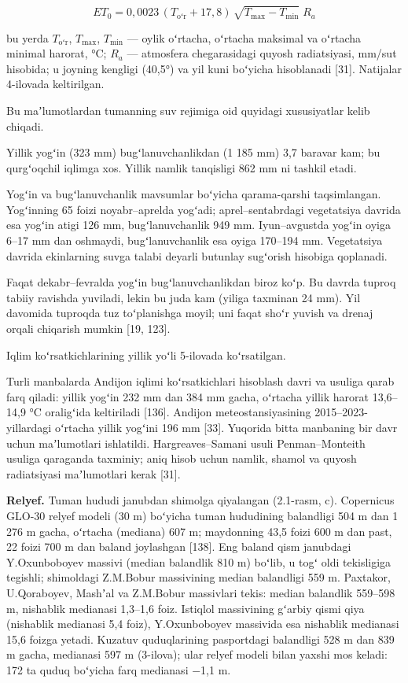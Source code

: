\documentclass[14pt,a4paper,oneside]{extreport}
\begin{document}
\begin{equation}\tag{2.1}
ET_0 = 0{,}0023 \, (T_{\mathrm{oʻr}} + 17{,}8) \, \sqrt{T_{\mathrm{max}} - T_{\mathrm{min}}} \; R_a
\end{equation}

bu yerda \(T_{\mathrm{oʻr}}\), \(T_{\mathrm{max}}\),
\(T_{\mathrm{min}}\) --- oylik oʻrtacha, oʻrtacha maksimal va oʻrtacha
minimal harorat, °C; \(R_{a}\) --- atmosfera chegarasidagi quyosh
radiatsiyasi, mm/sut hisobida; u joyning kengligi (40,5°) va yil kuni
boʻyicha hisoblanadi {[}31{]}. Natijalar 4-ilovada keltirilgan.

Bu maʼlumotlardan tumanning suv rejimiga oid quyidagi xususiyatlar kelib
chiqadi.

Yillik yogʻin (323 mm) bugʻlanuvchanlikdan (1 185 mm) 3,7 baravar kam;
bu qurgʻoqchil iqlimga xos. Yillik namlik tanqisligi 862 mm ni tashkil
etadi.

Yogʻin va bugʻlanuvchanlik mavsumlar boʻyicha qarama-qarshi
taqsimlangan. Yogʻinning 65 foizi noyabr--aprelda yogʻadi;
aprel--sentabrdagi vegetatsiya davrida esa yogʻin atigi 126 mm,
bugʻlanuvchanlik 949 mm. Iyun--avgustda yogʻin oyiga 6--17 mm dan
oshmaydi, bugʻlanuvchanlik esa oyiga 170--194 mm. Vegetatsiya davrida
ekinlarning suvga talabi deyarli butunlay sugʻorish hisobiga qoplanadi.

Faqat dekabr--fevralda yogʻin bugʻlanuvchanlikdan biroz koʻp. Bu davrda
tuproq tabiiy ravishda yuviladi, lekin bu juda kam (yiliga taxminan 24
mm). Yil davomida tuproqda tuz toʻplanishga moyil; uni faqat shoʻr
yuvish va drenaj orqali chiqarish mumkin {[}19, 123{]}.

Iqlim koʻrsatkichlarining yillik yoʻli 5-ilovada koʻrsatilgan.

Turli manbalarda Andijon iqlimi koʻrsatkichlari hisoblash davri va
usuliga qarab farq qiladi: yillik yogʻin 232 mm dan 384 mm gacha,
oʻrtacha yillik harorat 13,6--14,9 °C oraligʻida keltiriladi {[}136{]}.
Andijon meteostansiyasining 2015--2023-yillardagi oʻrtacha yillik
yogʻini 196 mm {[}33{]}. Yuqorida bitta manbaning bir davr uchun
maʼlumotlari ishlatildi. Hargreaves--Samani usuli Penman--Monteith
usuliga qaraganda taxminiy; aniq hisob uchun namlik, shamol va quyosh
radiatsiyasi maʼlumotlari kerak {[}31{]}.

\textbf{Relyef.} Tuman hududi janubdan shimolga qiyalangan (2.1-rasm,
c). Copernicus GLO-30 relyef modeli (30 m) boʻyicha tuman hududining
balandligi 504 m dan 1 276 m gacha, oʻrtacha (mediana) 607 m; maydonning
43,5 foizi 600 m dan past, 22 foizi 700 m dan baland joylashgan
{[}138{]}. Eng baland qism janubdagi Y.Oxunboboyev massivi (median
balandlik 810 m) boʻlib, u togʻ oldi tekisligiga tegishli; shimoldagi
Z.M.Bobur massivining median balandligi 559 m. Paxtakor, U.Qoraboyev,
Mashʼal va Z.M.Bobur massivlari tekis: median balandlik 559--598 m,
nishablik medianasi 1,3--1,6 foiz. Istiqlol massivining gʻarbiy qismi
qiya (nishablik medianasi 5,4 foiz), Y.Oxunboboyev massivida esa
nishablik medianasi 15,6 foizga yetadi. Kuzatuv quduqlarining
pasportdagi balandligi 528 m dan 839 m gacha, medianasi 597 m (3-ilova);
ular relyef modeli bilan yaxshi mos keladi: 172 ta quduq boʻyicha farq
medianasi −1,1 m.
\end{document}
